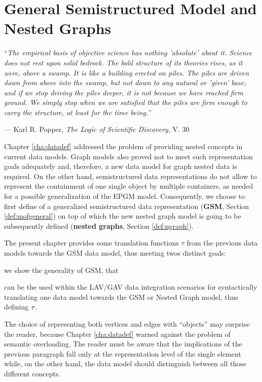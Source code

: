 \chapter{General Semistructured Model and Nested Graphs}\label{cha:graphsdef}
\epigraph{``\textit{The empirical basis of objective science has nothing 'absolute' about it. Science does not rest upon solid bedrock. The bold structure of its theories rises, as it were, above a swamp. It is like a building erected on piles. The piles are driven down from above into the swamp, but not down to any natural or 'given' base; and if we stop driving the piles deeper, it is not because we have reached firm ground. We simply stop when we are satisfied that the piles are firm enough to carry the structure, at least for the time being.}''}{--- Karl R. Popper, \textit{The Logic of Scientific Discovery}, V. 30}


Chapter \vref{cha:datadef}  addressed the problem of providing nested concepts in current data models. Graph models also proved not to meet such representation goals adequately and, therefore, a new data model for graph nested data is required. On the other hand, semistructured data representations do not allow to represent the containment of one single object by multiple containers, as needed for a possible generalization of the EPGM model. Consequently, we choose to first define of a generalized semistructured data representation (\textbf{GSM}, Section \ref{def:mofgeneral}) on top of which the new nested graph model is going to be subsequently defined (\textbf{nested graphs}, Section \ref{def:ngraph}). 

The present chapter provides some translation functions $\tau$ from the previous data models towards the GSM data model, thus meeting twos distinct goals: \begin{mylist}
	\item we show the generality of GSM, that
	\item can be the used within the LAV/GAV   data integration scenarios for syntactically translating one data model towards the GSM or Nested Graph model, thus defining $\ttransl$.
\end{mylist}
The choice of representing both vertices and edges with ``objects'' may surprise the reader, because Chapter \ref{cha:datadef} warned against the problem of semantic overloading. The reader must be aware that the implications of the previous paragraph fall only at the representation level of the single element while, on the other hand, the data model should distinguish between all those different concepts.


